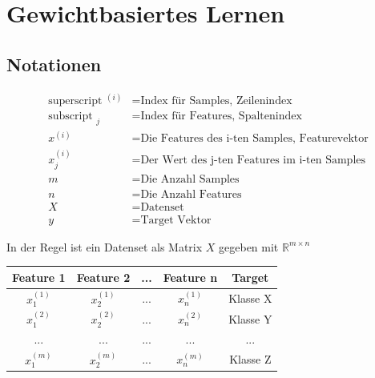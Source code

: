 \newpage
\section{Gewichtbasiertes Lernen}
\label{sec:weight_based_learning}
\subsection{Notationen}
\begin{flushleft}

\begin{align*}
\text{superscript } ^{(i)} &= \text{Index für Samples, Zeilenindex} \\
\text{subscript } _{j} &= \text{Index für Features, Spaltenindex} \\
x^{(i)} &= \text{Die Features des i-ten Samples, Featurevektor} \\
x_{j}^{(i)} &= \text{Der Wert des j-ten Features im i-ten Samples} \\
m &= \text{Die Anzahl Samples} \\
n &= \text{Die Anzahl Features} \\
X &= \text{Datenset} \\
y &= \text{Target Vektor}
\end{align*}

In der Regel ist ein Datenset als Matrix $X$ gegeben mit $\mathbb{R}^{m \times n}$


\begin{center}
	\begin{table}[h]
	\begin{tabular}{|c|c|c|c|c|}
		\hline
		\textbf{Feature 1} & \textbf{Feature 2} & \textbf{...} & \textbf{Feature n} & \textbf{Target} \\ 
		\hline
		$x_{1}^{(1)}$ & $x_{2}^{(1)}$ & ... & $x_{n}^{(1)}$ & Klasse X  \\ 
		\hline
		$x_{1}^{(2)}$ & $x_{2}^{(2)}$ & ... & $x_{n}^{(2)}$ & Klasse Y  \\ 
		\hline
		... & ...  & ... & ...  & ...  \\ 
		\hline
		$x_{1}^{(m)}$ & $x_{2}^{(m)}$  & ... & $x_{n}^{(m)}$  & Klasse Z  \\
		\hline
	\end{tabular}
\end{table}
\end{center}


\end{flushleft}



\newpage
